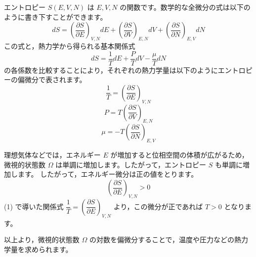 \solutionheading
\begin{solutionparts}

エントロピー $S(E, V, N)$ は $E, V, N$ の関数です。数学的な全微分の式は以下のように書き下すことができます。
\begin{equation*}
dS = \left( \frac{\partial S}{\partial E} \right)_{V, N} dE + \left( \frac{\partial S}{\partial V} \right)_{E, N} dV + \left( \frac{\partial S}{\partial N} \right)_{E, V} dN
\end{equation*}
この式と，熱力学から得られる基本関係式
\begin{equation*}
dS = \frac{1}{T} dE + \frac{P}{T} dV - \frac{\mu}{T} dN
\end{equation*}
の各係数を比較することにより，それぞれの熱力学量は以下のようにエントロピーの偏微分で表されます。
\begin{equation*}
\frac{1}{T} = \left( \frac{\partial S}{\partial E} \right)_{V, N}
\end{equation*}
\begin{equation*}
P = T \left( \frac{\partial S}{\partial V} \right)_{E, N}
\end{equation*}
\begin{equation*}
\mu = -T \left( \frac{\partial S}{\partial N} \right)_{E, V}
\end{equation*}

理想気体などでは，エネルギー $E$ が増加すると位相空間の体積が広がるため，微視的状態数 $\Omega$ は単調に増加します。したがって，エントロピー $S$ も単調に増加します。 したがって，エネルギー微分は正の値をとります。
\begin{equation*}
\left( \frac{\partial S}{\partial E} \right)_{V, N} > 0
\end{equation*}
(1) で導いた関係式 $\dfrac{1}{T} = \left( \dfrac{\partial S}{\partial E} \right)_{V, N}$ より，この微分が正であれば $T>0$ となります。

以上より，微視的状態数 $\Omega$ の対数を偏微分することで，温度や圧力などの熱力学量を求められます。

\end{solutionparts}
